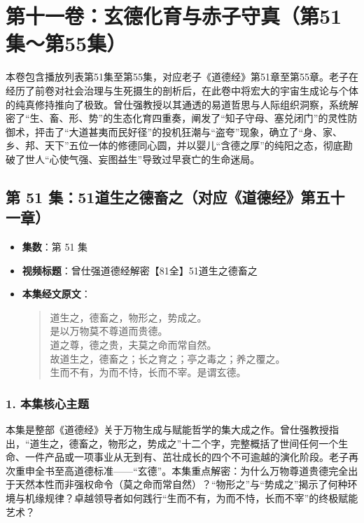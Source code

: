 \section*{第十一卷：玄德化育与赤子守真（第51集～第55集）}

本卷包含播放列表第51集至第55集，对应老子《道德经》第51章至第55章。老子在经历了前卷对社会治理与生死摄生的剖析后，在此卷中将宏大的宇宙生成论与个体的纯真修持推向了极致。曾仕强教授以其通透的易道哲思与人际组织洞察，系统解密了“生、畜、形、势”的生态化育四重奏，阐发了“知子守母、塞兑闭门”的灵性防御术，抨击了“大道甚夷而民好径”的投机狂潮与“盗夸”现象，确立了“身、家、乡、邦、天下”五位一体的修德同心圆，并以婴儿“含德之厚”的纯阳之态，彻底勘破了世人“心使气强、妄图益生”导致过早衰亡的生命迷局。

\clearpage

\subsection{第 51 集：51道生之德畜之（对应《道德经》第五十一章）}
\label{sec:ep51}

\begin{itemize}
    \item \textbf{集数}：第 51 集
    \item \textbf{视频标题}：曾仕强道德经解密【81全】51道生之德畜之
   
    \item \textbf{本集经文原文}：
    \begin{quote}\kaishu
    道生之，德畜之，物形之，势成之。\\
    是以万物莫不尊道而贵德。\\
    道之尊，德之贵，夫莫之命而常自然。\\
    故道生之，德畜之；长之育之；亭之毒之；养之覆之。\\
    生而不有，为而不恃，长而不宰。是谓玄德。
    \end{quote}
\end{itemize}

\subsubsection{1. 本集核心主题}
本集是整部《道德经》关于万物生成与赋能哲学的集大成之作。曾仕强教授指出，“道生之，德畜之，物形之，势成之”十二个字，完整概括了世间任何一个生命、一件产品或一项事业从无到有、茁壮成长的四个不可逾越的演化阶段。老子再次重申全书至高道德标准——“玄德”。本集重点解密：为什么万物尊道贵德完全出于天然本性而非强权命令（莫之命而常自然）？“物形之”与“势成之”揭示了何种环境与机缘规律？卓越领导者如何践行“生而不有，为而不恃，长而不宰”的终极赋能艺术？


